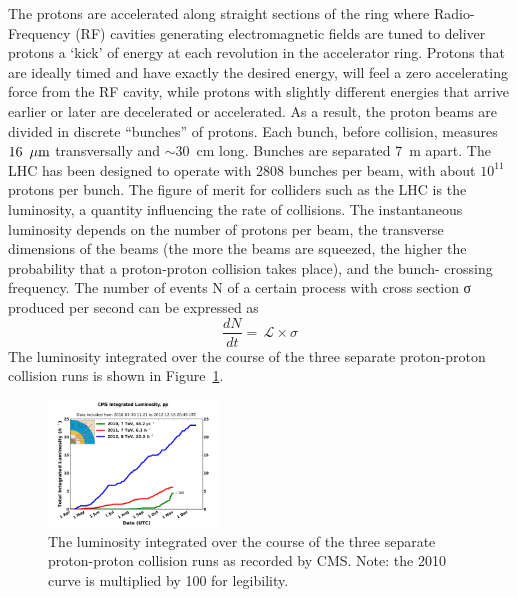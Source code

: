\indent The protons are accelerated along straight sections of the ring where 
Radio-Frequency (RF) cavities generating electromagnetic fields are 
tuned to deliver protons a ‘kick’ of energy at each revolution in the accelerator ring. 
Protons that are ideally timed and have exactly the desired energy, will feel 
a zero accelerating force from the RF cavity, while protons with slightly different 
energies that arrive earlier or later are decelerated or accelerated. As a result, 
the proton beams are divided in discrete ``bunches'' of protons. Each bunch, before collision,
measures $16~\,\mu\text{m}$ transversally and $\sim\!\!30$~cm long. Bunches are separated 7~m apart.
The LHC has been designed to operate with 2808 bunches per beam, with about $10^{11}$ protons per bunch. 
The figure of merit for colliders such as the LHC is the luminosity, a quantity 
influencing the rate of collisions. The instantaneous luminosity depends on the number of protons
per beam, the transverse dimensions of the beams (the more the beams are squeezed,
the higher the probability that a proton-proton collision takes place), and the bunch-
crossing frequency. The number of events N of a certain process with cross section σ
produced per second can be expressed as
%
\begin{equation}
  \label{eq:lumi}
  \frac{dN}{dt} = \,\mathcal{L} \times \sigma
\end{equation}
%
The luminosity integrated over the course of the three separate proton-proton collision runs
is shown in Figure~\ref{fig:int_lumi}. 

\begin{figure}[h!]
  \begin{center}
      \includegraphics[width=0.40\textwidth,]{figures/int_lumi_cumulative_pp_2.png}
      \caption{\label{fig:int_lumi} The luminosity integrated over the course of the three 
      separate proton-proton collision runs as recorded by CMS.  
      Note: the 2010 curve is multiplied by 100 for legibility.}
  \end{center}
\end{figure}

